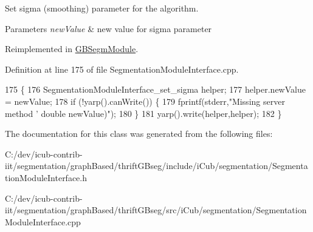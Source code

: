 Set sigma (smoothing) parameter for the algorithm. 


\begin{DoxyParams}{Parameters}
{\em new\+Value} & new value for sigma parameter \\
\hline
\end{DoxyParams}


Reimplemented in \hyperlink{classGBSegmModule_a27ffe08d394d321d9f9441423d36ef5e}{G\+B\+Segm\+Module}.



Definition at line 175 of file Segmentation\+Module\+Interface.\+cpp.


\begin{DoxyCode}
175                                                                  \{
176   SegmentationModuleInterface\_set\_sigma helper;
177   helper.newValue = newValue;
178   \textcolor{keywordflow}{if} (!yarp().canWrite()) \{
179     fprintf(stderr,\textcolor{stringliteral}{"Missing server method '%
       double newValue)"});
180   \}
181   yarp().write(helper,helper);
182 \}
\end{DoxyCode}


The documentation for this class was generated from the following files\+:\begin{DoxyCompactItemize}
\item 
C\+:/dev/icub-\/contrib-\/iit/segmentation/graph\+Based/thrift\+G\+Bseg/include/i\+Cub/segmentation/Segmentation\+Module\+Interface.\+h\item 
C\+:/dev/icub-\/contrib-\/iit/segmentation/graph\+Based/thrift\+G\+Bseg/src/i\+Cub/segmentation/Segmentation\+Module\+Interface.\+cpp\end{DoxyCompactItemize}
